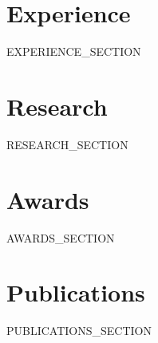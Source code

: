 \documentclass[]{deedy-resume-openfont}
\begin{document}
\begin{minipage}[t]{0.66\textwidth}


\section{Experience}
{{EXPERIENCE_SECTION}}


\section{Research}
{{RESEARCH_SECTION}}


\section{Awards}
{{AWARDS_SECTION}}


\section{Publications}
{{PUBLICATIONS_SECTION}}

\end{minipage}
\end{document}
